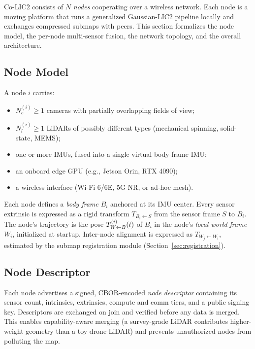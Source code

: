 \label{sec:system}

Co-LIC2 consists of $N$ \emph{nodes} cooperating over a wireless network. Each
node is a moving platform that runs a generalized Gaussian-LIC2 pipeline
locally and exchanges compressed submaps with peers. This section formalizes
the node model, the per-node multi-sensor fusion, the network topology, and the
overall architecture.

\subsection{Node Model}
\label{sec:node}

A node $i$ carries:
\begin{itemize}
  \item $N_c^{(i)} \geq 1$ cameras with partially overlapping fields of view;
  \item $N_l^{(i)} \geq 1$ LiDARs of possibly different types (mechanical
    spinning, solid-state, MEMS);
  \item one or more IMUs, fused into a single virtual body-frame IMU;
  \item an onboard edge GPU (e.g., Jetson Orin, RTX 4090);
  \item a wireless interface (Wi-Fi 6/6E, 5G NR, or ad-hoc mesh).
\end{itemize}

Each node defines a \emph{body frame} $B_i$ anchored at its IMU center. Every
sensor extrinsic is expressed as a rigid transform $T_{B_i \leftarrow S}$ from
the sensor frame $S$ to $B_i$. The node's trajectory is the pose
$T_{W\leftarrow B}^{(i)}(t)$ of $B_i$ in the node's \emph{local world frame} $W_i$,
initialized at startup. Inter-node alignment is expressed as
$T_{W_j \leftarrow W_i}$, estimated by the submap registration module
(Section~\ref{sec:registration}).

\subsection{Node Descriptor}
\label{sec:descriptor}

Each node advertises a signed, CBOR-encoded \emph{node descriptor} containing
its sensor count, intrinsics, extrinsics, compute and comm tiers, and a
public signing key. Descriptors are exchanged on join and verified before any
data is merged. This enables capability-aware merging (a survey-grade LiDAR
contributes higher-weight geometry than a toy-drone LiDAR) and prevents
unauthorized nodes from polluting the map.


